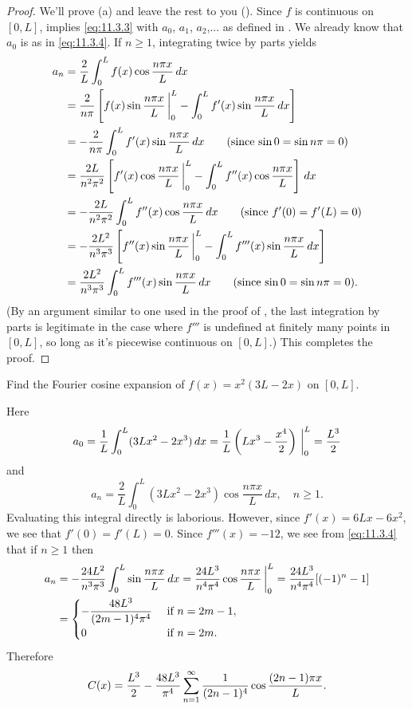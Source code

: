 \begin{proof}
We'll prove (a) and leave the rest to you
().  Since
$f$ is continuous on
$[0,L]$,  implies \eqref{eq:11.3.3} with $a_0$,
$a_1$, $a_2$,... as defined in . We already
know that
$a_0$ is as in
\eqref{eq:11.3.4}. If  $n\ge1$, integrating twice by parts yields
\begin{align*}
a_n&=\frac{2}{L}\int_0^L f(x)\cos\frac{n\pi x}{L}\,dx\\
&=\frac{2}{n\pi}\left[f(x)\sin\frac{n\pi x}{L}\,\bigg|_{0}^{L}
-\int_0^Lf'(x)\sin\frac{n\pi x}{L}\,dx\right]\\
&=-\frac{2}{n\pi}
\int_0^Lf'(x)\sin\frac{n\pi x}{L}\,dx
\qquad\text{(since $\sin0=\sin n\pi=0$)}\\
&=\frac{2L}{n^2\pi^2}\left[f'(x)\cos\frac{n\pi x}{L}\,\bigg|_{0}^{L}
-\int_0^Lf''(x)\cos\frac{n\pi x}{L}\right]\,dx\\
&=-\frac{2L}{n^2\pi^2}\int_0^Lf''(x)\cos\frac{n\pi x}{L}\,dx
\qquad\text{(since $f'(0)=f'(L)=0$)}\\
&=-\frac{2L^2}{n^3\pi^3}\left[f''(x)\sin\frac{n\pi x}{L}\,\bigg|_{0}^{L}
-\int_0^Lf'''(x)\sin\frac{n\pi x}{L}\,dx\right]\\
&=
\frac{2L^2}{n^3\pi^3}\int_0^Lf'''(x)\sin\frac{n\pi x}{L}\,dx
\qquad\text{(since $\sin0=\sin n\pi=0$).}
\end{align*}
(By an argument similar to one used in the proof of ,
 the last integration by parts is legitimate
in the case where $f'''$ is undefined at finitely many points in
$[0,L]$, so long as it's piecewise continuous on $[0,L]$.)
This completes the proof.
\end{proof}


\begin{example}\label{example:11.3.5}
Find the Fourier cosine expansion of $f(x)=x^2(3L-2x)$
on $[0,L]$.
\end{example}

\begin{solution}
Here
\[
a_0=\frac{1}{L}\int_0^L(3Lx^2-2x^3)\,dx=\frac{1}{L}\left(Lx^3-\frac{x^4}{2}
\right)\,\bigg|_{0}^{L}=\frac{L^3}{2}
\]
and
\[
a_n=\frac{2}{L}\int_0^L(3Lx^2-2x^3)\cos\frac{n\pi x}{L}\,dx,\quad n\ge1.
\]
Evaluating this integral directly is laborious.
However, since $f'(x)=6Lx-6x^2$, we see that $f'(0)=f'(L)=0$.
Since $f'''(x)=-12$, we see from \eqref{eq:11.3.4} that if $n\ge1$ then
\begin{align*}
a_n&=-\frac{24L^2}{n^3\pi^3}\int_0^L\sin\frac{n\pi x}{L}\,dx
=\frac{24L^3}{n^4\pi^4}\cos\frac{n\pi x}{L}\,\bigg|_{0}^{L}=\frac{24L^3}{n^4\pi^4}[(-1)^n-1]\\
&=
\begin{cases}
-\dfrac{48L^3}{(2m-1)^4\pi^4}&\text{ if  $n=2m-1$},\\
0&\text{ if $n=2m$.}
\end{cases}
\end{align*}
Therefore
\[
C(x)=\frac{L^3}{2}-\frac{48L^3}{\pi^4}\sum_{n=1}^\infty\frac{1}{(2n-1)^4}\cos\frac{(2n-1)\pi x}{L}.\qedhere
\]
\end{solution}

